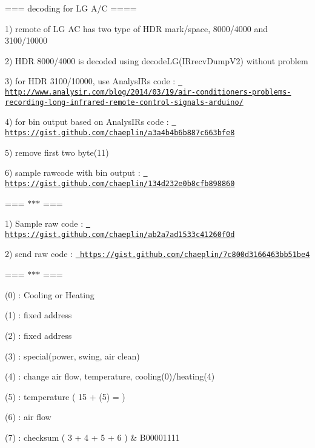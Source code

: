 === decoding for LG A/C ====
\begin{DoxyItemize}
\item 1) remote of LG AC has two type of HDR mark/space, 8000/4000 and 3100/10000
\item 2) HDR 8000/4000 is decoded using decode\+LG(\+IRrecv\+Dump\+V2) without problem
\item 3) for HDR 3100/10000, use Analys\+IR\textquotesingle{}s code \+: \href{http://www.analysir.com/blog/2014/03/19/air-conditioners-problems-recording-long-infrared-remote-control-signals-arduino/}{\texttt{ http\+://www.\+analysir.\+com/blog/2014/03/19/air-\/conditioners-\/problems-\/recording-\/long-\/infrared-\/remote-\/control-\/signals-\/arduino/}}
\item 4) for bin output based on Analys\+IR\textquotesingle{}s code \+: \href{https://gist.github.com/chaeplin/a3a4b4b6b887c663bfe8}{\texttt{ https\+://gist.\+github.\+com/chaeplin/a3a4b4b6b887c663bfe8}}
\item 5) remove first two byte(11)
\item 6) sample rawcode with bin output \+: \href{https://gist.github.com/chaeplin/134d232e0b8cfb898860}{\texttt{ https\+://gist.\+github.\+com/chaeplin/134d232e0b8cfb898860}}
\end{DoxyItemize}

=== $\ast$$\ast$$\ast$ ===
\begin{DoxyItemize}
\item 1) Sample raw code \+: \href{https://gist.github.com/chaeplin/ab2a7ad1533c41260f0d}{\texttt{ https\+://gist.\+github.\+com/chaeplin/ab2a7ad1533c41260f0d}}
\item 2) send raw code \+: \href{https://gist.github.com/chaeplin/7c800d3166463bb51be4}{\texttt{ https\+://gist.\+github.\+com/chaeplin/7c800d3166463bb51be4}}
\end{DoxyItemize}

=== $\ast$$\ast$$\ast$ ===
\begin{DoxyItemize}
\item (0) \+: Cooling or Heating
\item (1) \+: fixed address
\item (2) \+: fixed address
\item (3) \+: special(power, swing, air clean)
\item (4) \+: change air flow, temperature, cooling(0)/heating(4)
\item (5) \+: temperature ( 15 + (5) = )
\item (6) \+: air flow
\item (7) \+: checksum ( 3 + 4 + 5 + 6 ) \& B00001111
\end{DoxyItemize}

